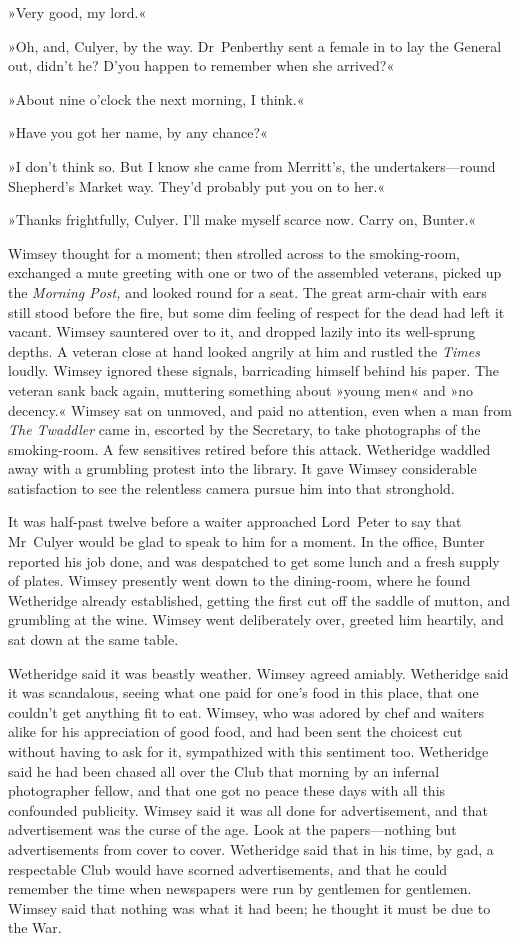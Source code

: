 »Very good, my lord.«

»Oh, and, Culyer, by the way. Dr~Penberthy sent a female in to lay the General out, didn't he? D'you happen to remember when she arrived?«

»About nine o'clock the next morning, I think.«

»Have you got her name, by any chance?«

»I don't think so. But I know she came from Merritt's, the undertakers—round Shepherd's Market way. They'd probably put you on to her.«

»Thanks frightfully, Culyer. I'll make myself scarce now. Carry on, Bunter.«

Wimsey thought for a moment; then strolled across to the smoking-room, exchanged a mute greeting with one or two of the assembled veterans, picked up the \textit{Morning Post,} and looked round for a seat. The great arm-chair with ears still stood before the fire, but some dim feeling of respect for the dead had left it vacant. Wimsey sauntered over to it, and dropped lazily into its well-sprung depths. A veteran close at hand looked angrily at him and rustled the \textit{Times} loudly. Wimsey ignored these signals, barricading himself behind his paper. The veteran sank back again, muttering something about »young men« and »no decency.« Wimsey sat on unmoved, and paid no attention, even when a man from \textit{The Twaddler} came in, escorted by the Secretary, to take photographs of the smoking-room. A few sensitives retired before this attack. Wetheridge waddled away with a grumbling protest into the library. It gave Wimsey considerable satisfaction to see the relentless camera pursue him into that stronghold.

It was half-past twelve before a waiter approached Lord~Peter to say that Mr~Culyer would be glad to speak to him for a moment. In the office, Bunter reported his job done, and was despatched to get some lunch and a fresh supply of plates. Wimsey presently went down to the dining-room, where he found Wetheridge already established, getting the first cut off the saddle of mutton, and grumbling at the wine. Wimsey went deliberately over, greeted him heartily, and sat down at the same table.

Wetheridge said it was beastly weather. Wimsey agreed amiably. Wetheridge said it was scandalous, seeing what one paid for one's food in this place, that one couldn't get anything fit to eat. Wimsey, who was adored by chef and waiters alike for his appreciation of good food, and had been sent the choicest cut without having to ask for it, sympathized with this sentiment too. Wetheridge said he had been chased all over the Club that morning by an infernal photographer fellow, and that one got no peace these days with all this confounded publicity. Wimsey said it was all done for advertisement, and that advertisement was the curse of the age. Look at the papers—nothing but advertisements from cover to cover. Wetheridge said that in his time, by gad, a respectable Club would have scorned advertisements, and that he could remember the time when newspapers were run by gentlemen for gentlemen. Wimsey said that nothing was what it had been; he thought it must be due to the War.

